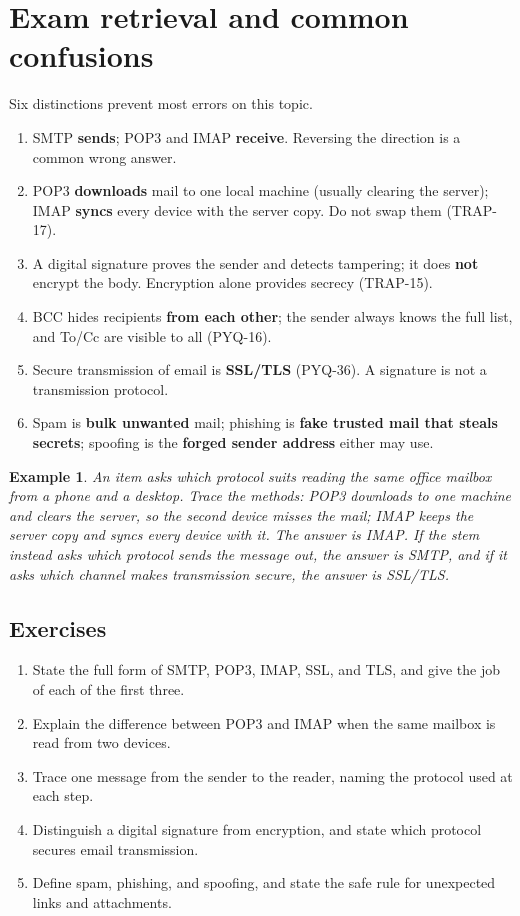 \documentclass[11pt]{article}
\newtheorem{example}{Example}[section]
\begin{document}
\section{Exam retrieval and common confusions}
Six distinctions prevent most errors on this topic.
\begin{enumerate}
  \item SMTP \textbf{sends}; POP3 and IMAP \textbf{receive}. Reversing the
    direction is a common wrong answer.
  \item POP3 \textbf{downloads} mail to one local machine (usually clearing
    the server); IMAP \textbf{syncs} every device with the server copy.
    Do not swap them (TRAP-17).
  \item A digital signature proves the sender and detects tampering; it
    does \textbf{not} encrypt the body. Encryption alone provides secrecy
    (TRAP-15).
  \item BCC hides recipients \textbf{from each other}; the sender always
    knows the full list, and To/Cc are visible to all (PYQ-16).
  \item Secure transmission of email is \textbf{SSL/TLS} (PYQ-36). A
    signature is not a transmission protocol.
  \item Spam is \textbf{bulk unwanted} mail; phishing is \textbf{fake
    trusted mail that steals secrets}; spoofing is the \textbf{forged
    sender address} either may use.
\end{enumerate}

\begin{example}
An item asks which protocol suits reading the same office mailbox from a
phone and a desktop. Trace the methods: POP3 downloads to one machine and
clears the server, so the second device misses the mail; IMAP keeps the
server copy and syncs every device with it. The answer is IMAP. If the stem
instead asks which protocol sends the message out, the answer is SMTP, and
if it asks which channel makes transmission secure, the answer is SSL/TLS.
\end{example}

\subsection*{Exercises}
\begin{enumerate}[label=\arabic*.]
  \item State the full form of SMTP, POP3, IMAP, SSL, and TLS, and give the
    job of each of the first three.
  \item Explain the difference between POP3 and IMAP when the same mailbox
    is read from two devices.
  \item Trace one message from the sender to the reader, naming the
    protocol used at each step.
  \item Distinguish a digital signature from encryption, and state which
    protocol secures email transmission.
  \item Define spam, phishing, and spoofing, and state the safe rule for
    unexpected links and attachments.
\end{enumerate}
\end{document}
